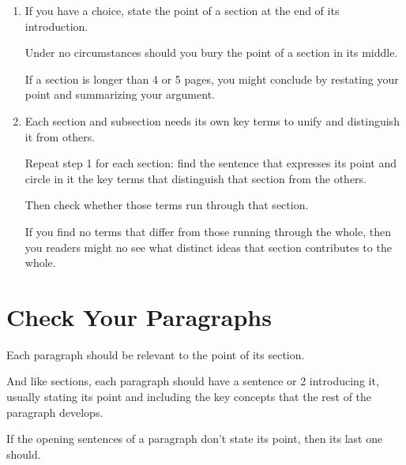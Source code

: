 \documentclass[oneside]{book}
\numberwithin{equation}{section}
\begin{document}
\begin{enumerate}
    For each section, ask, 
    
    If it doesn't help to answer 1 of the 5 questions whose answers constitute an argument (see \textbf{5.2}), think about its relevance: does it create a context, explain a background concept or issue, or help readers in some other way?
    
    \item {}
    
    If you have a choice, state the point of a section at the end of its introduction.
    
    Under no circumstances should you bury the point of a section in its middle.
    
    If a section is longer than 4 or 5 pages, you might conclude by restating your point and summarizing your argument.
    \item {}
    
    Each section and subsection needs its own key terms to unify and distinguish it from others.
    
    Repeat step 1 for each section: find the sentence that expresses its point and circle in it the key terms that distinguish that section from the others.
    
    Then check whether those terms run through that section.
    
    If you find no terms that differ from those running through the whole, then you readers might no see what distinct ideas that section contributes to the whole.
\end{enumerate}

\section{Check Your Paragraphs}
Each paragraph should be relevant to the point of its section.

And like sections, each paragraph should have a sentence or 2 introducing it, usually stating its point and including the key concepts that the rest of the paragraph develops.

If the opening sentences of a paragraph don't state its point, then its last one should.
\end{document}
